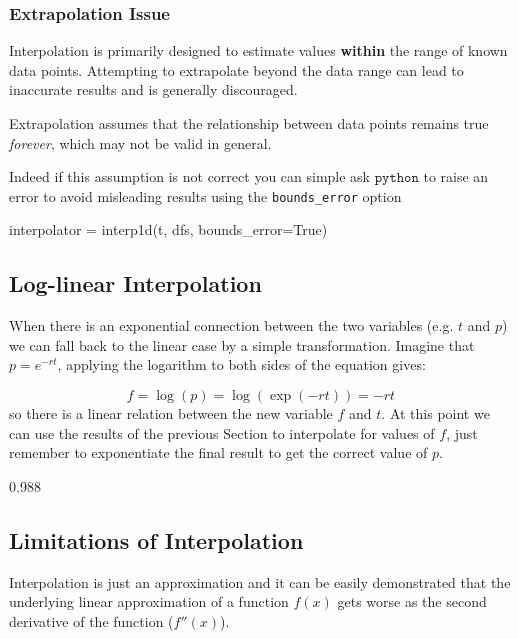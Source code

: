 \subsubsection{Extrapolation Issue}

Interpolation is primarily designed to estimate values \textbf{within} the range of known data points. Attempting to extrapolate beyond the data range can lead to inaccurate results and is generally discouraged. 

Extrapolation assumes that the relationship between data points remains true \emph{forever}, which may not be valid in general.

Indeed if this assumption is not correct you can simple ask $\texttt{python}$ to raise an error to avoid misleading results using the \texttt{bounds\_error} option
\begin{ipython}
interpolator = interp1d(t, dfs, bounds_error=True)
\end{ipython} 

\subsection{Log-linear Interpolation}
\label{log-linear-interpolation}

When there is an exponential connection between the two variables (e.g. $t$ and $p$) we can fall back to the linear case by a simple transformation. 
Imagine that $p=e^{-rt}$, applying the logarithm to both sides of the equation gives:

\begin{equation}
f = \log(p) = \log(\exp(-rt)) = -rt
\end{equation}
so there is a linear relation between the new variable $f$ and $t$. At this point we can use the results of the previous Section to interpolate for values of $f$, just remember to exponentiate the final result to get the correct value of $p$.


\begin{ioutput}
0.988
\end{ioutput}

\subsection{Limitations of Interpolation}
Interpolation is just an approximation and it can be easily demonstrated that the underlying linear approximation of a function $f(x)$ gets worse as the second derivative of the function ($f''(x)$). 

